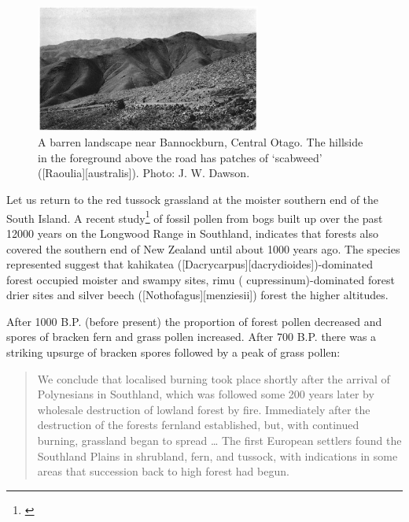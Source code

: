 \begin{figure}
	\centering
	\includegraphics[width=0.66\textwidth]{graphics/figure86barren.jpg}
	\caption[A barren landscape near Bannockburn]{A barren landscape near Bannockburn, Central Otago.
	The hillside in the foreground above the road has patches of `scabweed' ([Raoulia][australis]).
	Photo:  J. W. Dawson.}%
	\label{fig:86barren}
\end{figure}

Let us return to the red tussock grassland at the moister southern end of the South Island.
A recent study\footnote{\cite{mcglone1983vegetation}} of fossil pollen from bogs built up over the past 12000 years on the Longwood Range in Southland, indicates that forests also covered the southern end of New Zealand until about 1000 years ago.
The species represented suggest that kahikatea ([Dacrycarpus][dacrydioides])-dominated forest occupied moister and swampy sites, rimu ( cupressinum)-dominated forest drier sites and silver beech ([Nothofagus][menziesii]) forest the higher altitudes.

After 1000 B.P. (before present) the proportion of forest pollen decreased and spores of bracken fern and grass pollen increased.
After 700 B.P. there was a striking upsurge of bracken spores followed by a peak of grass pollen:

\begin{quote}
	We conclude that localised burning took place shortly after the arrival of Polynesians in Southland, which was followed some 200 years later by wholesale destruction of lowland forest by fire.
	Immediately after the destruction of the forests fernland established, but, with continued burning, grassland began to spread … The first European settlers found the Southland Plains in shrubland, fern, and tussock, with indications in some areas that succession back to high forest had begun.
\end{quote}


